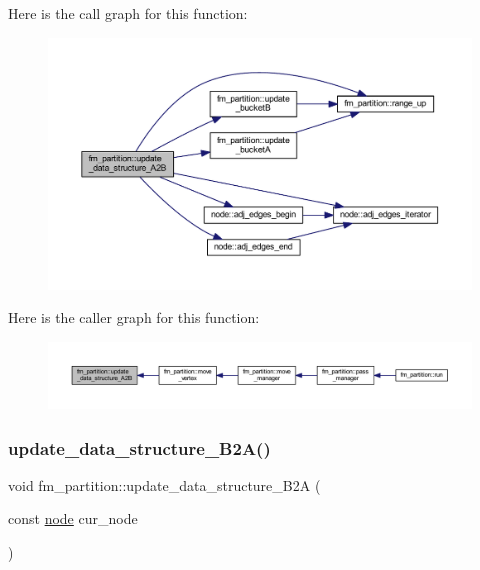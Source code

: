Here is the call graph for this function\+:\nopagebreak
\begin{figure}[H]
\begin{center}
\leavevmode
\includegraphics[width=350pt]{classfm__partition_a8bd7f2715334e9ec95da8001117fdde5_cgraph}
\end{center}
\end{figure}
Here is the caller graph for this function\+:\nopagebreak
\begin{figure}[H]
\begin{center}
\leavevmode
\includegraphics[width=350pt]{classfm__partition_a8bd7f2715334e9ec95da8001117fdde5_icgraph}
\end{center}
\end{figure}
\mbox{\label{classfm__partition_a783174f29d49e7e1ae7f6cf71faa82fb}} 
\subsubsection{\texorpdfstring{update\+\_\+data\+\_\+structure\+\_\+\+B2\+A()}{update\_data\_structure\_B2A()}}
{\footnotesize\ttfamily void fm\+\_\+partition\+::update\+\_\+data\+\_\+structure\+\_\+\+B2A (\begin{DoxyParamCaption}\item[{const \mbox{\hyperlink{classnode}{node}}}]{cur\+\_\+node }\end{DoxyParamCaption})\hspace{0.3cm}{\ttfamily [protected]}}



